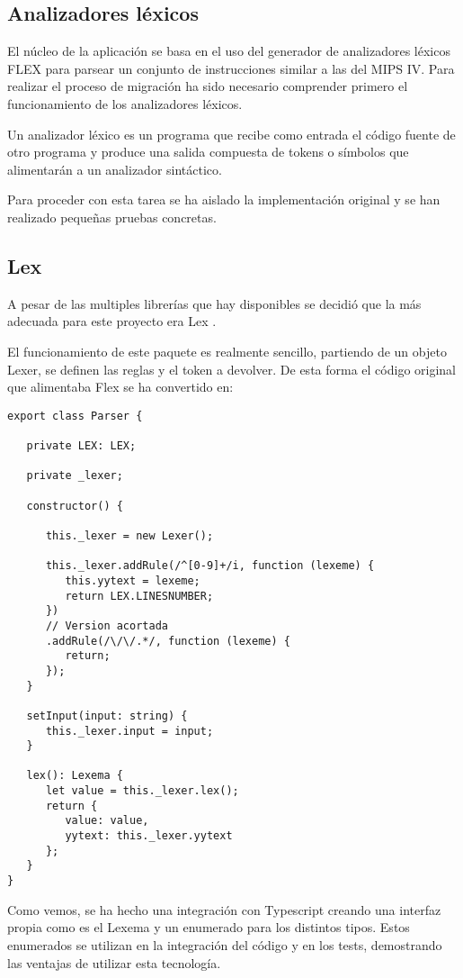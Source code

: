 \subsection{Analizadores léxicos}
El núcleo de la aplicación se basa en el uso del generador de analizadores 
léxicos FLEX para parsear un conjunto de instrucciones similar a las del MIPS IV. 
Para realizar el proceso de migración ha sido necesario comprender primero el 
funcionamiento de los analizadores léxicos.

\bigskip
Un analizador léxico es un programa que recibe como entrada el código fuente de 
otro programa y produce una salida compuesta de tokens o símbolos 
que alimentarán a un analizador sintáctico.

\bigskip
Para proceder con esta tarea se ha aislado la implementación original y se han 
realizado pequeñas pruebas concretas.

\subsection{Lex}

A pesar de las multiples librerías que hay disponibles se decidió que la más adecuada 
para este proyecto era Lex \cite{Lex}. 

El funcionamiento de este paquete es realmente sencillo, partiendo de un 
objeto Lexer, se definen las reglas y el token a devolver. De esta forma
el código original que alimentaba Flex se ha convertido en: 

\begin{lstlisting}
export class Parser {

   private LEX: LEX;

   private _lexer;

   constructor() {

      this._lexer = new Lexer();

      this._lexer.addRule(/^[0-9]+/i, function (lexeme) {
         this.yytext = lexeme;
         return LEX.LINESNUMBER;
      })
      // Version acortada
      .addRule(/\/\/.*/, function (lexeme) {
         return;
      });
   }

   setInput(input: string) {
      this._lexer.input = input;
   }

   lex(): Lexema {
      let value = this._lexer.lex();
      return {
         value: value,
         yytext: this._lexer.yytext
      };
   }
}
\end{lstlisting}

Como vemos, se ha hecho una integración con Typescript creando una interfaz propia como es 
el Lexema y un enumerado para los distintos tipos. Estos enumerados se utilizan en la integración 
del código y en los tests, demostrando las ventajas de utilizar esta tecnología.